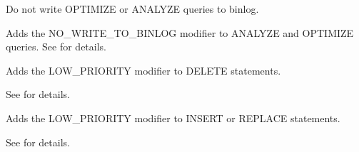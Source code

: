 \documentclass[letterpaper,10pt,english]{sphinxmanual}
\begin{document}
\begin{fulllineitems}
\label{\detokenize{mariadb-archiver:cmdoption-mariadb-archiver-local}}
Do not write OPTIMIZE or ANALYZE queries to binlog.

Adds the NO\_WRITE\_TO\_BINLOG modifier to ANALYZE and OPTIMIZE queries.  See
{\hyperref[\detokenize{mariadb-archiver:cmdoption-mariadb-archiver-analyze}]{}} for details.

\end{fulllineitems}


\begin{fulllineitems}
\label{\detokenize{mariadb-archiver:cmdoption-mariadb-archiver-low-priority-delete}}
Adds the LOW\_PRIORITY modifier to DELETE statements.

See  for details.

\end{fulllineitems}


\begin{fulllineitems}
\label{\detokenize{mariadb-archiver:cmdoption-mariadb-archiver-low-priority-insert}}
Adds the LOW\_PRIORITY modifier to INSERT or REPLACE statements.

See  for details.

\end{fulllineitems}
\end{document}
